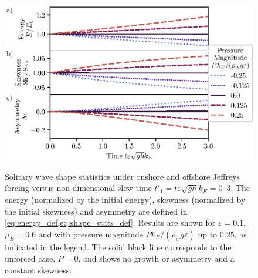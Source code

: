 \documentclass{jfm}
\renewcommand*{\epsilon}{\varepsilon}
\begin{document}
\begin{figure}
  \centering
  { %
    \label{fig:statistics_solitary:a}
    \label{fig:statistics_solitary:b}
    \label{fig:statistics_solitary:c}
  }
  \includegraphics{Skew-Asymm-Production.eps}
  \caption{
    Solitary wave shape statistics under onshore and offshore
    Jeffreys forcing versus non-dimensional slow time $t'_1 = t
    \epsilon \sqrt{gh} k_E = \numrange{0}{3}$.
    The
    energy (normalized by the initial energy),
    skewness (normalized by the initial skewness) and
    asymmetry are defined in
    \cref{eq:energy_def,eq:shape_stats_def}.
    Results are shown for $\epsilon=0.1$, $\mu_E = 0.6$ and with
    pressure magnitude $P k_E/(\rho_w g \epsilon)$ up to $0.25$, as
    indicated in the legend.
    The solid black line corresponds to the unforced case, $P = 0$, and
    shows no growth or asymmetry and a constant skewness.
  }\label{fig:statistics_solitary}
\end{figure}
\end{document}
